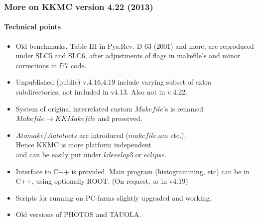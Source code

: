 \documentclass{beamer}
\begin{document}
\begin{frame}[fragile]
\frametitle{\bf More on KKMC version 4.22 (2013)}
\framesubtitle{\bf\large Technical points}
\small
\begin{itemize}
\item
Old benchmarks, Table III in Pys.Rev. D 63 (2001) and more,
are reproduced under SLC5 and SLC6, 
after adjustments of flags in makefile's
and minor corrections in f77 code.
\item
Unpublished (public) v.4.16,4.19 include varying subset of extra subdirectories,
not included in v4.13. Also not in v.4.22.
\item
System of original interrelated custom $Makefile$'s 
is renamed $Makefile\to KKMakefile$
and preserved.
\item
$Atomake/Autotools$ are introduced ($makefile.am$ etc.).\\
Hence KKMC is more platform independent\\
and can be easily put under $kdevelop3$ or $eclipse$.
\item
Interface to C++ is provided.
Main program (histogramming, etc) can be in C++, using optionally ROOT.
(On request, or in v4.19)
\item
Scripts for running on PC-farms slightly upgraded and working.
\item
Old versions of PHOTOS and TAUOLA.
\end{itemize}
\end{frame}
\end{document}
